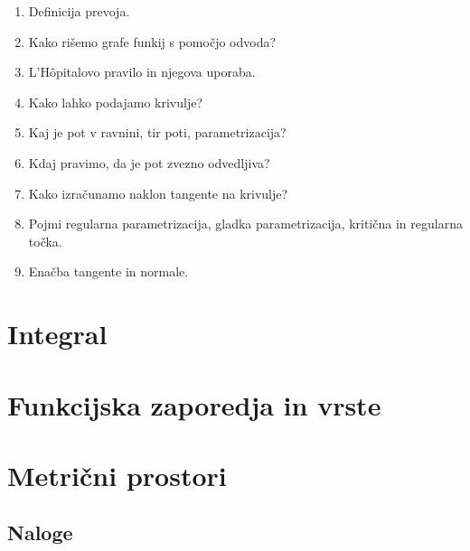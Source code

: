 \documentclass[a4paper,12pt]{report}
\begin{document}
\begin{enumerate}
    \item Definicija prevoja.
    \item Kako rišemo grafe funkij s pomočjo odvoda?
    \item L'Hôpitalovo pravilo in njegova uporaba.
    \item Kako lahko podajamo krivulje?
    \item Kaj je pot v ravnini, tir poti, parametrizacija?
    \item Kdaj pravimo, da je pot zvezno odvedljiva?
    \item Kako izračunamo naklon tangente na krivulje?
    \item Pojmi regularna parametrizacija, gladka parametrizacija, kritična in regularna točka.
    \item Enačba tangente in normale.
\end{enumerate}


\chapter{Integral}


\chapter{Funkcijska zaporedja in vrste}


\chapter{Metrični prostori}

\section*{Naloge}
\end{document}
